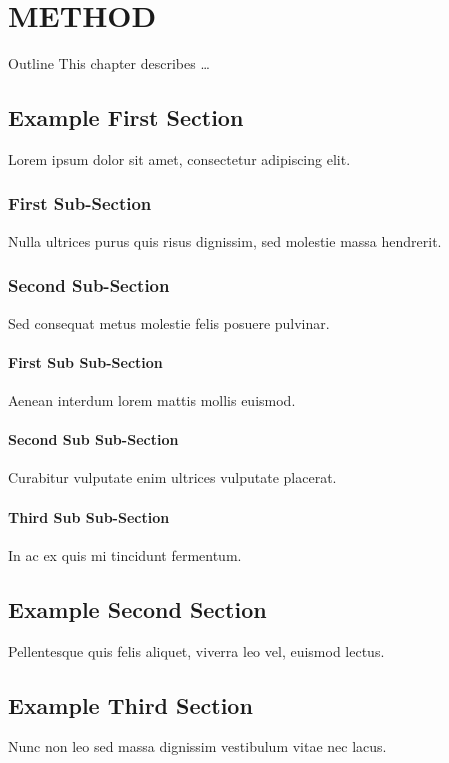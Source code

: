\chapter{METHOD}\label{ch:method}
\thispagestyle{empty}

\begin{outline}{Outline}
  This chapter describes \dots
\end{outline}


\section{Example First Section}
Lorem ipsum dolor sit amet, consectetur adipiscing elit.

\subsection{First Sub-Section}
Nulla ultrices purus quis risus dignissim, sed molestie massa hendrerit.

\subsection{Second Sub-Section}
Sed consequat metus molestie felis posuere pulvinar.

\subsubsection{First Sub Sub-Section}
Aenean interdum lorem mattis mollis euismod.

\subsubsection{Second Sub Sub-Section}
Curabitur vulputate enim ultrices vulputate placerat.

\subsubsection{Third Sub Sub-Section}
In ac ex quis mi tincidunt fermentum.

\section{Example Second Section}
Pellentesque quis felis aliquet, viverra leo vel, euismod lectus.

\section{Example Third Section}
Nunc non leo sed massa dignissim vestibulum vitae nec lacus.
